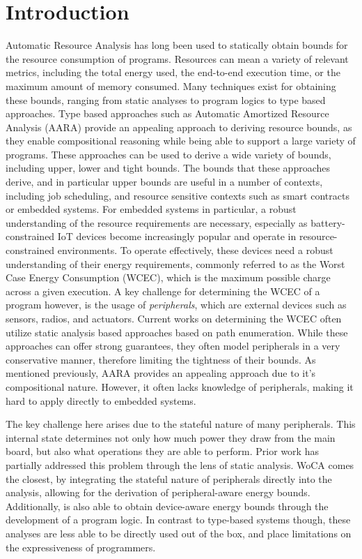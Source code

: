 \section{Introduction}
Automatic Resource Analysis has long been used to statically obtain bounds for the resource consumption of programs. Resources can mean a variety of relevant metrics, including the total energy used, the end-to-end execution time, or the maximum amount of memory consumed. Many techniques exist for obtaining these bounds, ranging from static analyses to program logics to type based approaches.  Type based approaches such as Automatic Amortized Resource Analysis (AARA) provide an appealing approach to deriving resource bounds, as they enable compositional reasoning while being able to support a large variety of programs. These approaches can be used to derive a wide variety of bounds, including upper, lower and tight bounds. The bounds that these approaches derive, and in particular upper bounds are useful in a number of contexts, including job scheduling, and resource sensitive contexts such as smart contracts or embedded systems. For embedded systems in particular, a robust understanding of the resource requirements are necessary, especially as battery-constrained IoT devices become increasingly popular and operate in resource-constrained environments. To operate effectively, these devices need a robust understanding of their energy requirements, commonly referred to as the Worst Case Energy Consumption (WCEC), which is the maximum possible charge across a given execution. A key challenge for determining the WCEC of a program however, is the usage of \textit{peripherals}, which are external devices such as sensors, radios, and actuators. Current works on determining the WCEC often utilize static analysis based approaches based on path enumeration.  While these approaches can offer strong guarantees, they often model peripherals in a very conservative manner, therefore limiting the tightness of their bounds. As mentioned previously, AARA provides an appealing approach due to it's compositional nature. However, it often lacks knowledge of peripherals, making it hard to apply directly to embedded systems.  

The key challenge here arises due to the stateful nature of many peripherals. This internal state determines not only how much power they draw from the main board, but also what operations they are able to perform. Prior work has partially addressed this problem through the lens of static analysis. WoCA \cite{woca} comes the closest, by integrating the stateful nature of peripherals directly into the analysis, allowing for the derivation of peripheral-aware energy bounds. Additionally, \cite{energy hoare logic paper} is also able to obtain device-aware energy bounds through the development of a program logic. In contrast to type-based systems though, these analyses are less able to be directly used out of the box, and place limitations on the expressiveness of programmers. 


